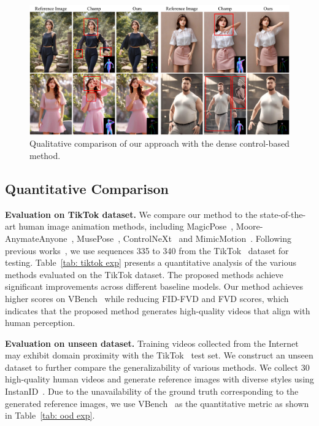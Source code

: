 \begin{figure}[t]
    \centering
    \includegraphics[width=1.0\columnwidth]{./image/exp.pdf}
    \vspace{-20pt}
    \caption{Qualitative comparison of our approach with the dense control-based method.}
    \label{fig: com_champ}
\end{figure}

\subsection{Quantitative Comparison}
\textbf{Evaluation on TikTok dataset.}
We compare our method to the state-of-the-art human image animation methods, including MagicPose~\citep{chang2023magicpose}, Moore-AnymateAnyone~\citep{moore-animateanyone}, MusePose~\citep{musepose}, ControlNeXt~\citep{peng2024controlnext} and MimicMotion~\citep{zhang2024mimicmotion}. Following previous works~\citep{zhang2024mimicmotion,wang2024disco}, we use sequences 335 to 340 from the TikTok~\citep{jafarian2021tiktok} dataset for testing.
Table~\ref{tab: tiktok exp} presents a quantitative analysis of the various methods evaluated on the TikTok dataset. The proposed methods achieve significant improvements across different baseline models. Our method achieves higher scores on VBench~\citep{huang2024vbench} while reducing FID-FVD and FVD scores, which indicates that the proposed method generates high-quality videos that align with human perception.


\textbf{Evaluation on unseen dataset.}
Training videos collected from the Internet may exhibit domain proximity with the TikTok~\citep{jafarian2021tiktok} test set. We construct an unseen dataset to further compare the generalizability of various methods. We collect 30 high-quality human videos and generate reference images with diverse styles using InstanID~\citep{wang2024instantid}. Due to the unavailability of the ground truth corresponding to the generated reference images, we use VBench~\citep{huang2024vbench} as the quantitative metric as shown in Table~\ref{tab: ood exp}.


